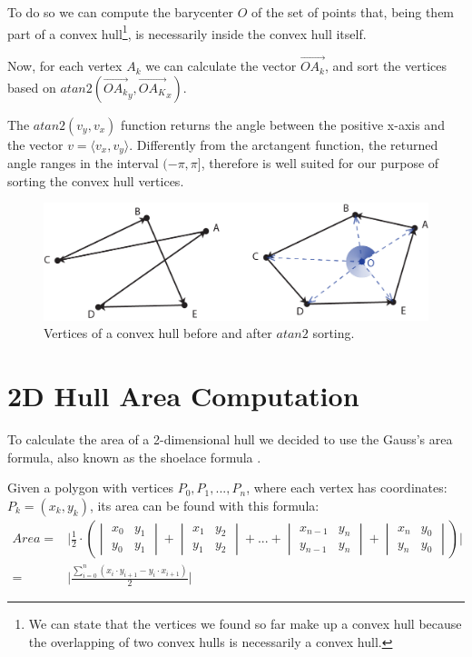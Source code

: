 \documentclass{PoliMi_MasterThesis}
\begin{document}
To do so we can compute the barycenter $O$ of the set of points that, being them part of a convex hull\footnote{We can state that the vertices we found so far make up a convex hull because the overlapping of two convex hulls is necessarily a convex hull.}, is necessarily inside the convex hull itself.

Now, for each vertex $A_k$ we can calculate the vector $\overrightarrow{OA_k}$, and sort the vertices based on $atan2(\overrightarrow{OA_k}_y, \overrightarrow{OA_K}_x)$.

The $atan2(v_y, v_x)$ function returns the angle between the positive x-axis and the vector $v=\langle v_x, v_y \rangle$. Differently from the arctangent function, the returned angle ranges in the interval $(-\pi, \pi]$, therefore is well suited for our purpose of sorting the convex hull vertices.

\begin{figure}[H]
    \centering
    \includegraphics[scale=0.4]{Images/vertices_sorting.png} 
    \caption{Vertices of a convex hull before and after $atan2$ sorting.}
    \label{fig:vertices_sorting}
\end{figure}

\section{2D Hull Area Computation} \label{sec:2dHull_area_computation}
To calculate the area of a 2-dimensional hull we decided to use the Gauss's area formula, also known as the shoelace formula \cite{shoelace_formula}.

Given a polygon with vertices $P_0, P_1, ..., P_n$, where each vertex has coordinates: $P_k = (x_k, y_k)$, its area can be found with this formula:
\begin{align*}
	Area =& \bigg|\frac{1}{2}\cdot\left(\begin{vmatrix} x_0 & y_1\\y_0 & y_1 \end{vmatrix} + \begin{vmatrix} x_1 & y_2\\y_1 & y_2 \end{vmatrix} + ... + \begin{vmatrix} x_{n-1} & y_n\\y_{n-1} & y_n \end{vmatrix} + \begin{vmatrix} x_n & y_0\\y_n & y_0 \end{vmatrix}\right)\bigg|\\
	=& \Bigg|\frac{\displaystyle\sum_{i=0}^{n}(x_i \cdot y_{i+1} - y_i \cdot x_{i+1})}{2}\Bigg|
\end{align*}
\end{document}

